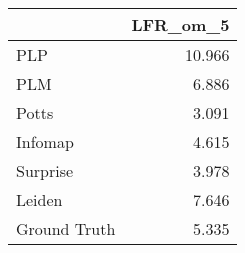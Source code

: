 \begin{tabular}{lr}
\toprule
{} & LFR_om_5 \\
\midrule
PLP          &   10.966 \\
PLM          &    6.886 \\
Potts        &    3.091 \\
Infomap      &    4.615 \\
Surprise     &    3.978 \\
Leiden       &    7.646 \\
Ground Truth &    5.335 \\
\bottomrule
\end{tabular}
